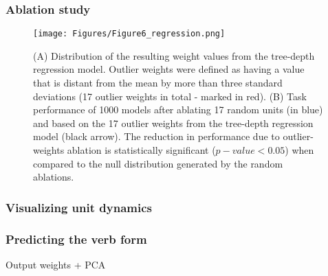 \lipsum[1]

\subsubsection{Ablation study}
\lipsum[1]

\begin{figure}[b]
\centering
\texttt{[image: Figures/Figure6\_regression.png]}
\caption{(A) Distribution of the resulting weight values from the tree-depth regression model. Outlier weights were defined as having a value that is distant from the mean by more than three standard deviations (17 outlier weights in total - marked in red). (B) Task performance of 1000 models after ablating 17 random units (in blue) and based on the 17 outlier weights from the tree-depth regression model (black arrow). The reduction in performance due to outlier-weights ablation is statistically significant ($p-value < 0.05$) when compared to the null distribution generated by the random ablations.}
\end{figure}

\subsubsection{Visualizing unit dynamics}
\lipsum[1]

\subsubsection{Predicting the verb form}
Output weights + PCA
\lipsum[1]

